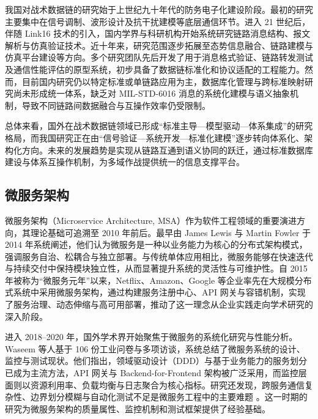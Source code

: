 我国对战术数据链的研究始于上世纪九十年代的防务电子化建设阶段。最初的研究主要集中在信号调制、波形设计及抗干扰建模等底层通信环节\cite{wray_sheppard_1986_jtids_nav,ranger1996_jn}。进入 21 世纪后，伴随 {Link16} 技术的引入，国内学界与科研机构开始系统研究链路消息结构、报文解析与仿真验证技术\cite{fried1978_taes,fried1984_navigation}。近十年来，研究范围逐步拓展至态势信息融合、链路建模与仿真平台建设等方向\cite{doherty1988_jn,L3Harris_MIDS_LVT_2025}。多个研究团队先后开发了用于消息格式验证、链路转发测试及通信性能评估的原型系统，初步具备了数据链标准化和协议适配的工程能力。然而，目前国内研究仍以特定标准或单链路应用为主，数据库化管理与跨标准映射研究尚未形成统一体系，缺乏对 MIL-STD-6016 消息的系统化建模与语义抽象机制，导致不同链路间数据融合与互操作效率仍受限制。

总体来看，国外在战术数据链领域已形成“标准主导—模型驱动—体系集成”的研究格局，而我国研究正在由“信号验证—系统开发—标准化建模”逐步转向体系化、架构化方向。未来的发展趋势是实现从链路互通到语义协同的跃迁，通过标准数据库建设与体系互操作机制，为多域作战提供统一的信息支撑平台。

\subsection{微服务架构}

微服务架构（Microservice Architecture, MSA）作为软件工程领域的重要演进方向，其理论基础可追溯至 2010 年前后。最早由 James Lewis 与 Martin Fowler 于 2014 年系统阐述，他们认为微服务是一种以业务能力为核心的分布式架构模式，强调服务自治、松耦合与独立部署。与传统单体应用相比，微服务能够在快速迭代与持续交付中保持模块独立性，从而显著提升系统的灵活性与可维护性。自 2015 年被称为“微服务元年”以来，Netflix、Amazon、Google 等企业率先在大规模分布式系统中采用微服务架构，通过构建服务注册中心、API 网关与容错机制，实现了服务治理、动态伸缩与高可用部署，推动了这一理念从企业实践走向学术研究的深入阶段。

进入 2018–2020 年，国外学术界开始聚焦于微服务的系统化研究与性能分析。Waseem 等人基于 106 份工业问卷与多项访谈，系统总结了微服务系统的设计、监控与测试现状。他们指出，领域驱动设计（DDD）与基于业务能力的服务划分已成为主流方法，API 网关与 Backend-for-Frontend 架构被广泛采用，而监控层面则以资源利用率、负载均衡与日志聚合为核心指标。研究还发现，跨服务通信复杂性、边界划分模糊与自动化测试不足是微服务工程中的主要难题 \cite{Waseem2021Design}。这一时期的研究为微服务架构的质量属性、监控机制和测试框架提供了经验基础。

